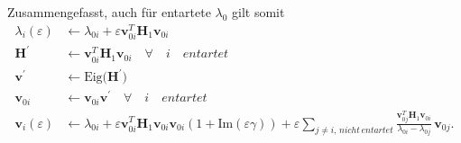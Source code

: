 Zusammengefasst, auch für entartete $\lambda_0$ gilt somit
\begin{align*}
    \lambda_i(\varepsilon)
    & \gets
    \lambda_{0i} + \varepsilon \bm v_{0i}^T \bm H_1 \bm v_{0i}\\
    \bm H^\prime & \gets \bm v_{0i}^T \bm H_1 \bm v_{0i} \quad \forall \quad i \quad entartet \\
    \bm v^\prime & \gets \mathrm{Eig} \Big( \bm H^\prime \Big) \\
    \bm v_{0i} & \gets \bm v_{0i} \bm v^\prime  \quad \forall \quad i \quad entartet \\
    \bm v_i(\varepsilon)
    & \gets
    \lambda_{0i} + \varepsilon \bm v_{0i}^T \bm H_1 \bm v_{0i}
        \bm v_{0i} ( 1 + \mathrm{Im}(\varepsilon \gamma) ) + \varepsilon \sum_{j \neq i, \,nicht\,entartet}
        \frac{\bm v_{0j}^T \bm H_1 \bm v_{0i}}{\lambda_{0i} - \lambda_{0j}}
        \, \bm v_{0j}.
\end{align*}